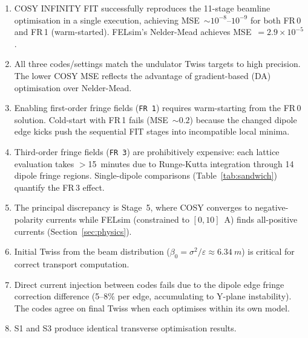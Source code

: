 \documentclass[11pt]{article}
\begin{document}
\begin{enumerate}
  \item COSY INFINITY FIT successfully reproduces the 11-stage beamline
    optimisation in a single execution, achieving MSE~$\sim 10^{-8}$--$10^{-9}$
    for both FR\,0 and FR\,1 (warm-started).
    FELsim's Nelder-Mead achieves MSE~$= 2.9 \times 10^{-5}$.
  \item All three codes/settings match the undulator Twiss targets to
    high precision. The lower COSY MSE reflects the advantage of
    gradient-based (DA) optimisation over Nelder-Mead.
  \item Enabling first-order fringe fields (\texttt{FR\,1}) requires
    warm-starting from the FR\,0 solution. Cold-start with FR\,1 fails
    (MSE~$\sim 0.2$) because the changed dipole edge kicks push the
    sequential FIT stages into incompatible local minima.
  \item Third-order fringe fields (\texttt{FR\,3}) are prohibitively
    expensive: each lattice evaluation takes $>$15~minutes due to
    Runge-Kutta integration through 14 dipole fringe regions.
    Single-dipole comparisons (Table~\ref{tab:sandwich}) quantify
    the FR\,3 effect.
  \item The principal discrepancy is Stage~5, where COSY converges to
    negative-polarity currents while FELsim (constrained to $[0, 10]$~A)
    finds all-positive currents (Section~\ref{sec:physics}).
  \item Initial Twiss from the beam distribution ($\beta_0 = \sigma^2/\varepsilon
    \approx \SI{6.34}{m}$) is critical for correct transport computation.
  \item Direct current injection between codes fails due to the dipole edge
    fringe correction difference (5--8\% per edge, accumulating to Y-plane
    instability). The codes agree on final Twiss when each optimises
    within its own model.
  \item S1 and S3 produce identical transverse optimisation results.
\end{enumerate}
\end{document}
